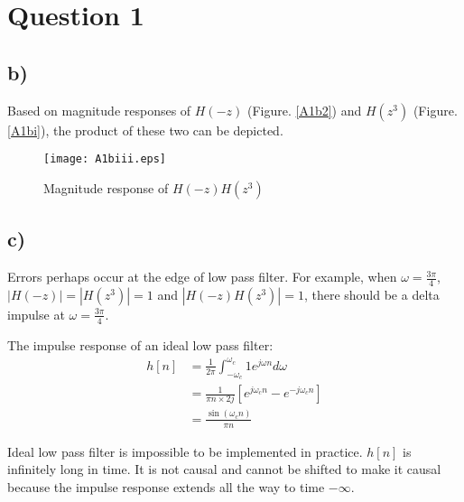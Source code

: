 \documentclass{article}
\newenvironment{homeworkProblem}[1]{
	\section*{#1}
	}{
}
\newenvironment{homeworkSection}[1]{
	\subsection*{#1}
	}{
}
\begin{document}
\begin{homeworkProblem}{Question 1}
\begin{homeworkSection}{b)}
Based on magnitude responses of $H(-z)$ (Figure. \ref{A1b2}) and $H(z^3)$ (Figure. \ref{A1bi}), the product of these two can be depicted.

\begin{figure}[H]
\centering
\texttt{[image: A1biii.eps]}
\caption{Magnitude response of $H(-z) H(z^3)$}
\label{A1biii}
\end{figure}

\end{homeworkSection}

\begin{homeworkSection}{c)}

Errors perhaps occur at the edge of low pass filter. For example, when $\omega = \frac{3 \pi}{4}$, $|H(-z)| = |H(z^3)| = 1$ and $|H(-z) H(z^3)| = 1$, there should be a delta impulse at $\omega = \frac{3 \pi}{4}$.

The impulse response of an ideal low pass filter:
\begin{align*}
h[n] &= \frac{1}{2\pi} \int_{-\omega_c}^{\omega_c} 1 e^{j \omega n} d\omega\\
&= \frac{1}{\pi n \times 2j} [e^{j \omega_c n} - e^{-j \omega_c n}]\\
&= \frac{\sin(\omega_c n)}{\pi n}
\end{align*}

Ideal low pass filter is impossible to be implemented in practice. $h[n]$ is infinitely long in time. It is not causal and cannot be shifted to make it causal because the impulse response extends all the way to time $-\infty$.
\end{homeworkSection}

\end{homeworkProblem}
\end{document}

